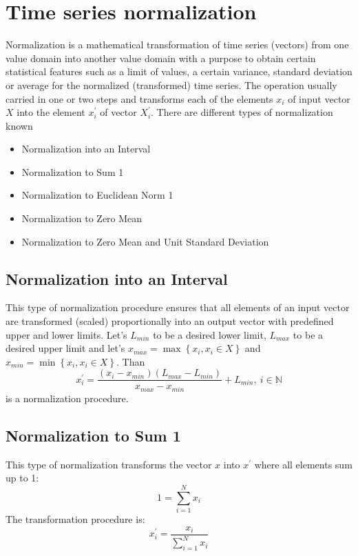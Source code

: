 \section{Time series normalization}

Normalization is a mathematical transformation of time series (vectors) from one value domain into another value domain with a purpose to obtain certain statistical features such as a limit of values, a certain variance, standard deviation or average for the normalized (transformed) time series. The operation usually carried in one or two steps and transforms each of the elements $x_{i}$ of input vector $X$ into the element $x_{i}^{'}$ of vector $X_{i}^{'}$. There are different types of normalization known
\begin{itemize}
	\item Normalization into an Interval \cite{citeulike:4295248} \cite{citeulike:2753031}
  \item Normalization to Sum 1
  \item Normalization to Euclidean Norm 1
  \item Normalization to Zero Mean
  \item Normalization to Zero Mean and Unit Standard Deviation \cite{citeulike:3815880}
\end{itemize}

\subsection{Normalization into an Interval}
This type of normalization procedure ensures that all elements of an input vector are transformed (scaled) proportionally into an output vector with predefined upper and lower limits.
Let's $L_{min}$ to be a desired lower limit, $L_{max}$ to be a desired upper limit and let's $x_{max} = \max \left\{ x_{i}, x_{i} \in X \right\}$ and $x_{min} = \min \left\{ x_{i}, x_{i} \in X \right\}$. Than
\[
x_{i}^{'} = \frac{ (x_{i}-x_{min}) (L_{max} - L_{min}) }{ x_{max} - x_{min} } + L_{min	}, \: i \in \mathbb{N}
\]
is a normalization procedure.

\subsection{Normalization to Sum 1}
This type of normalization transforms the vector $x$ into $x^{'}$ where all elements sum up to 1:
\[
1 = \sum_{i=1}^{N} x_{i}
\]
The transformation procedure is:
\[
x_{i}^{'} = \frac{ x_{i} }{ \sum_{i=1}^{N} x_{i} }
\]

